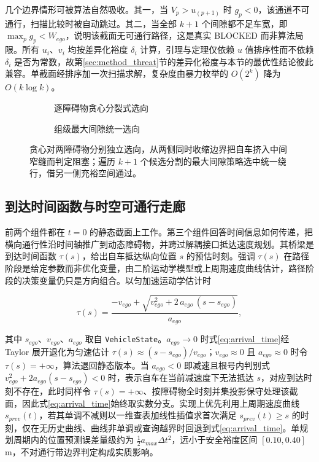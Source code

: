 \documentclass[a4paper,11pt]{ctexart}
\theoremstyle{definition}
\begin{document}
几个边界情形可被算法自然吸收。其一，当 $V_p>u_{(p+1)}$ 时 $g_p<0$，该通道不可通行，扫描比较时被自动跳过。其二，当全部 $k+1$ 个间隙都不足车宽，即 $\max_p g_p < W_{ego}$，说明该截面无可通行路径，这是真实 BLOCKED 而非算法局限。所有 $u_i$、$v_i$ 均按差异化裕度 $\delta_i$ 计算，引理与定理仅依赖 $u$ 值排序性而不依赖 $\delta_i$ 是否为常数，故第\ref{sec:method_threat}节的差异化裕度与本节的最优性结论彼此兼容。单截面经排序加一次扫描求解，复杂度由暴力枚举的 $O(2^k)$ 降为 $O(k\log k)$。

\begin{figure}[htbp]
\centering
\begin{subfigure}[b]{0.46\textwidth}
  \centering
  \caption{逐障碍物贪心分裂式选向}
\end{subfigure}\hfill
\begin{subfigure}[b]{0.46\textwidth}
  \centering
  \caption{组级最大间隙统一选向}
\end{subfigure}
\caption{两个近似对称障碍物下贪心选向与组级最优的差异}
\caption*{贪心对两障碍物分别独立选向，从两侧同时收缩边界把自车挤入中间窄缝而判定阻塞；遍历 $k{+}1$ 个候选分割的最大间隙策略选中统一绕行，借另一侧充裕空间通过。}
\label{fig:greedy_vs_global}
\end{figure}

\subsection{到达时间函数与时空可通行走廊}
\label{sec:method_corridor}

前两个组件都在 $t=0$ 的静态截面上工作。第三个组件回答时间信息如何传递，把横向通行性沿时间轴推广到动态障碍物，并跨过解耦接口抵达速度规划。其桥梁是到达时间函数 $\tau(s)$，给出自车抵达纵向位置 $s$ 的预估时刻。强调 $\tau(s)$ 在路径阶段是给定参数而非优化变量，由二阶运动学模型或上周期速度曲线估计，路径阶段的决策变量仍只是方向组合。以匀加速运动学估计时

\begin{equation}
    \tau(s) = \frac{-v_{ego} + \sqrt{v_{ego}^{2} + 2\,a_{ego}\,(s - s_{ego})}}{a_{ego}},
    \label{eq:arrival_time}
\end{equation}

其中 $s_{ego}$、$v_{ego}$、$a_{ego}$ 取自 \texttt{VehicleState}。$a_{ego}\to 0$ 时式\eqref{eq:arrival_time}经 Taylor 展开退化为匀速估计 $\tau(s)\approx (s-s_{ego})/v_{ego}$；$v_{ego}\approx 0$ 且 $a_{ego}\approx 0$ 时令 $\tau(s)=+\infty$，算法退回静态版本。当 $a_{ego}<0$ 即减速且根号内判别式 $v_{ego}^{2}+2a_{ego}(s-s_{ego})<0$ 时，表示自车在当前减速度下无法抵达 $s$，对应到达时刻不存在，此时同样令 $\tau(s)=+\infty$、按障碍物全时刻并集投影保守处理该截面，因此式\eqref{eq:arrival_time}始终取实数分支。实现上优先利用上周期速度曲线 $s_{prev}(t)$，若其单调不减则以一维查表加线性插值求首次满足 $s_{prev}(t)\geq s$ 的时刻，仅在无历史曲线、曲线非单调或查询越界时回退到式\eqref{eq:arrival_time}。单规划周期内的位置预测误差量级约为 $\tfrac{1}{2}a_{max}\Delta t^{2}$，远小于安全裕度区间 $[0.10, 0.40]$\,m，不对通行带边界判定构成实质影响。
\end{document}
